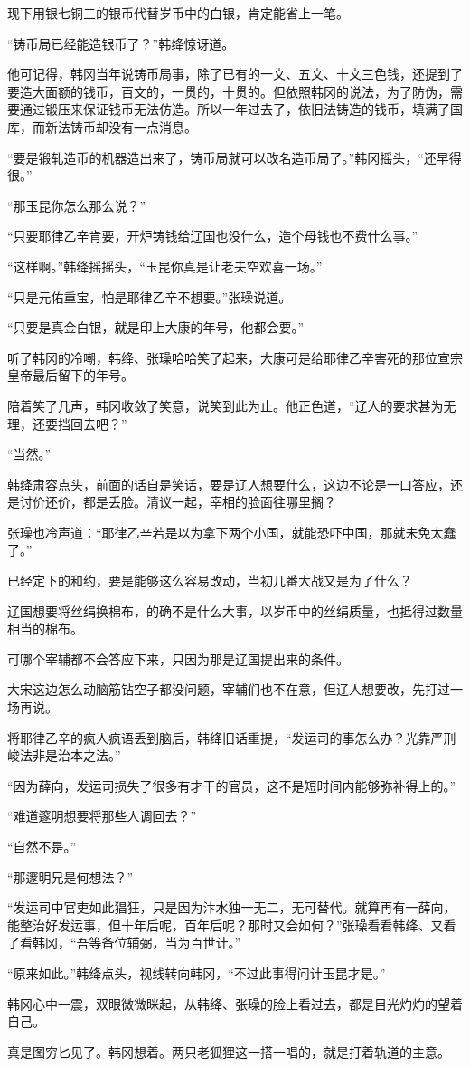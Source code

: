 现下用银七铜三的银币代替岁币中的白银，肯定能省上一笔。

“铸币局已经能造银币了？”韩绛惊讶道。

他可记得，韩冈当年说铸币局事，除了已有的一文、五文、十文三色钱，还提到了要造大面额的钱币，百文的，一贯的，十贯的。但依照韩冈的说法，为了防伪，需要通过锻压来保证钱币无法仿造。所以一年过去了，依旧法铸造的钱币，填满了国库，而新法铸币却没有一点消息。

“要是锻轧造币的机器造出来了，铸币局就可以改名造币局了。”韩冈摇头，“还早得很。”

“那玉昆你怎么那么说？”

“只要耶律乙辛肯要，开炉铸钱给辽国也没什么，造个母钱也不费什么事。”

“这样啊。”韩绛摇摇头，“玉昆你真是让老夫空欢喜一场。”

“只是元佑重宝，怕是耶律乙辛不想要。”张璪说道。

“只要是真金白银，就是印上大康的年号，他都会要。”

听了韩冈的冷嘲，韩绛、张璪哈哈笑了起来，大康可是给耶律乙辛害死的那位宣宗皇帝最后留下的年号。

陪着笑了几声，韩冈收敛了笑意，说笑到此为止。他正色道，“辽人的要求甚为无理，还要挡回去吧？”

“当然。”

韩绛肃容点头，前面的话自是笑话，要是辽人想要什么，这边不论是一口答应，还是讨价还价，都是丢脸。清议一起，宰相的脸面往哪里搁？

张璪也冷声道：“耶律乙辛若是以为拿下两个小国，就能恐吓中国，那就未免太蠢了。”

已经定下的和约，要是能够这么容易改动，当初几番大战又是为了什么？

辽国想要将丝绢换棉布，的确不是什么大事，以岁币中的丝绢质量，也抵得过数量相当的棉布。

可哪个宰辅都不会答应下来，只因为那是辽国提出来的条件。

大宋这边怎么动脑筋钻空子都没问题，宰辅们也不在意，但辽人想要改，先打过一场再说。

将耶律乙辛的疯人疯语丢到脑后，韩绛旧话重提，“发运司的事怎么办？光靠严刑峻法非是治本之法。”

“因为薛向，发运司损失了很多有才干的官员，这不是短时间内能够弥补得上的。”

“难道邃明想要将那些人调回去？”

“自然不是。”

“那邃明兄是何想法？”

“发运司中官吏如此猖狂，只是因为汴水独一无二，无可替代。就算再有一薛向，能整治好发运事，但十年后呢，百年后呢？那时又会如何？”张璪看看韩绛、又看了看韩冈，“吾等备位辅弼，当为百世计。”

“原来如此。”韩绛点头，视线转向韩冈，“不过此事得问计玉昆才是。”

韩冈心中一震，双眼微微眯起，从韩绛、张璪的脸上看过去，都是目光灼灼的望着自己。

真是图穷匕见了。韩冈想着。两只老狐狸这一搭一唱的，就是打着轨道的主意。
